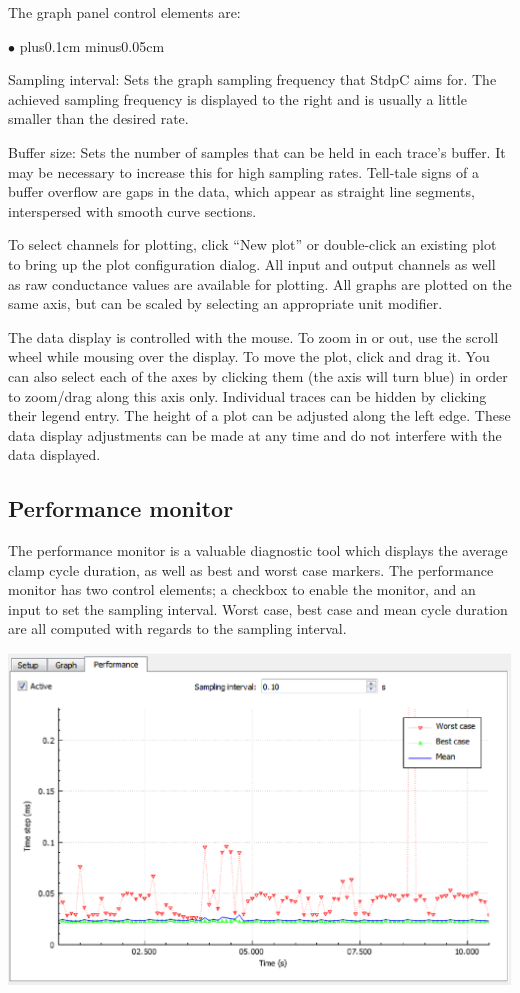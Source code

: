 \documentclass{article}
\newenvironment{myitem}{\begin{list}{$\bullet$}{\setlength{\leftmargin}{1.1em}
\itemsep0.1cm plus0.1cm minus0.05cm
\listparindent0cm
\addtolength{\labelsep}{0.5\labelsep}
\setlength{\labelwidth}{0.8em}
\setlength{\leftmargin}{\labelwidth}
\addtolength{\leftmargin}{\labelsep}
}}{\end{list}}
\begin{document}
The graph panel control elements are:
\begin{myitem}
\item Sampling interval: Sets the graph sampling frequency that StdpC aims for.
The achieved sampling frequency is displayed to the right and is usually a little
smaller than the desired rate.
\item Buffer size: Sets the number of samples that can be held in each trace's buffer.
It may be necessary to increase this for high sampling rates. Tell-tale signs of a
buffer overflow are gaps in the data, which appear as straight line segments,
interspersed with smooth curve sections.
\end{myitem}

To select channels for plotting, click ``New plot'' or double-click an existing plot to bring up
the plot configuration dialog. All input and output channels as well as raw conductance values are
available for plotting. All graphs are plotted on the same axis, but can be scaled by selecting an
appropriate unit modifier.

The data display is controlled with the mouse. To zoom in or out, use the scroll
wheel while mousing over the display. To move the plot, click and drag it. You can also select
each of the axes by clicking them (the axis will turn blue) in order to zoom/drag along
this axis only. Individual traces can be hidden by clicking their legend entry. The height of a plot
can be adjusted along the left edge.
These data display adjustments can be made at any time and do not interfere with the data displayed.

\subsection{Performance monitor}

The performance monitor is a valuable diagnostic tool which displays the
average clamp cycle duration, as well as best and worst case markers. The performance
monitor has two control elements; a checkbox to enable the monitor, and an input to
set the sampling interval. Worst case, best case and mean cycle duration are all
computed with regards to the sampling interval. \\[0.2cm]
\parbox{\textwidth}{
	\includegraphics[scale=0.6]{performanceMonitor}
} \\[0.2cm]
\end{document}
